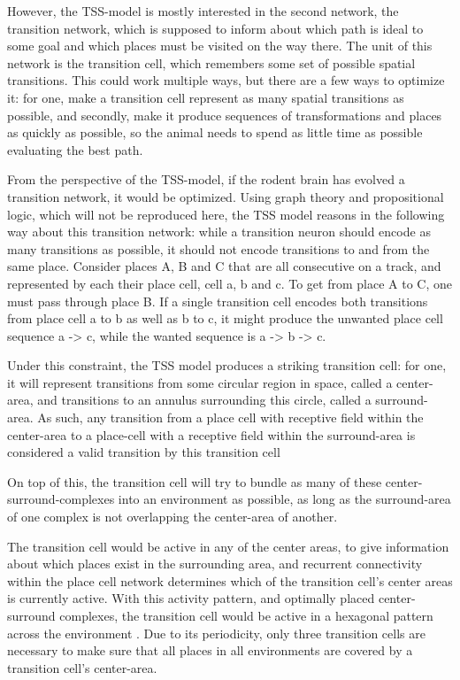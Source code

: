 \documentclass{article}
\begin{document}
    However, the TSS-model is mostly interested in the second network, the transition network, which is supposed to inform about which path is ideal to some goal and which places must be visited on the way there. The unit of this network is the transition cell, which remembers some set of possible spatial transitions. This could work multiple ways, but there are a few ways to optimize it: for one, make a transition cell represent as many spatial transitions as possible, and secondly, make it produce sequences of transformations and places as quickly as possible, so the animal needs to spend as little time as possible evaluating the best path.

    From the perspective of the TSS-model, if the rodent brain has evolved a transition network, it would be optimized. Using graph theory and propositional logic, which will not be reproduced here, the TSS model reasons in the following way about this transition network: while a transition neuron should encode as many transitions as possible, it should not encode transitions to and from the same place. Consider places A, B and C that are all consecutive on a track, and represented by each their place cell, cell a, b and c. To get from place A to C, one must pass through place B. If a single transition cell encodes both transitions from place cell a to b as well as b to c, it might produce the unwanted place cell sequence a -> c, while the wanted sequence is a -> b -> c.

    Under this constraint, the TSS model produces a striking transition cell: for one, it will represent transitions from some circular region in space, called a center-area, and transitions to an annulus surrounding this circle, called a surround-area. As such, any transition from a place cell with receptive field within the center-area to a place-cell with a receptive field within the surround-area is considered a valid transition by this transition cell

    On top of this, the transition cell will try to bundle as many of these center-surround-complexes into an environment as possible, as long as the surround-area of one complex is not overlapping the center-area of another.

    The transition cell would be active in any of the center areas, to give information about which places exist in the surrounding area, and recurrent connectivity within the place cell network determines which of the transition cell's center areas is currently active. With this activity pattern, and optimally placed center-surround complexes, the transition cell would be active in a hexagonal pattern across the environment \parencite{Waniek2018,Kunsch2005}. Due to its periodicity, only three transition cells are necessary to make sure that all places in all environments are covered by a transition cell's center-area.
\end{document}
